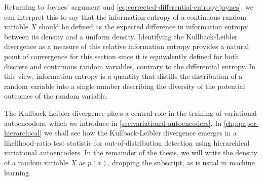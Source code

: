 Returning to Jaynes' argument and \cref{eq:corrected-differential-entropy-jaynes}, we can interpret this to say that the information entropy of a continuous random variable $X$ should be defined as the expected difference in information entropy between its density and a uniform density. 
Identifying the Kullback-Leibler divergence as a measure of this relative information entropy provides a natural point of convergence for this section since it is equivalently defined for both discrete and continuous random variables, contrary to the differential entropy. 
In this view, information entropy is a quantity that distills the distribution of a random variable into a single number describing the diversity of the potential outcomes of the random variable.

The Kullback-Leibler divergence plays a central role in the training of variational autoencoders, which we introduce in \cref{sec:variational-autoencoders}. In \cref{chp:paper-hierarchical} we shall see how the Kullback-Leibler divergence emerges in a likelihood-ratio test statistic for out-of-distribution detection using hierarchical variational autoencoders. 
In the remainder of the thesis, we will write the density of a random variable $X$ as $p(x)$, dropping the subscript, as is usual in machine learning. 



